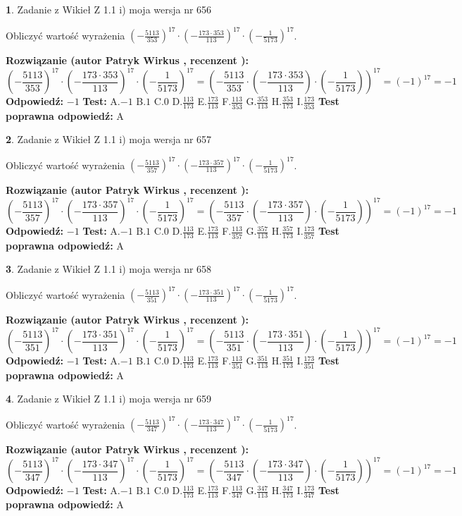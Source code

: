 \documentclass[12pt, a4paper]{article}
\theoremstyle{definition} %
\newtheorem{zad}{}
\newcommand{\zadStart}[1]{\begin{zad}#1\newline}
\newcommand{\zadStop}{\end{zad}}
\newcommand{\rozwStart}[2]{\noindent \textbf{Rozwiązanie (autor #1 , recenzent #2): }\newline}
\newcommand{\rozwStop}{\newline}
\newcommand{\odpStart}{\noindent \textbf{Odpowiedź:}\newline}
\newcommand{\odpStop}{\newline}
\newcommand{\testStart}{\noindent \textbf{Test:}\newline}
\newcommand{\testStop}{\newline}
\newcommand{\kluczStart}{\noindent \textbf{Test poprawna odpowiedź:}\newline}
\newcommand{\kluczStop}{\newline}
\begin{document}
\zadStart{Zadanie z Wikieł Z 1.1 i) moja wersja nr 656}

Obliczyć wartość wyrażenia $(-\frac{5113}{353})^{17} \cdot (-\frac{173 \cdot 353}{113})^{17} \cdot (-\frac{1}{5173})^{17}$.
\zadStop
\rozwStart{Patryk Wirkus}{}
$$(-\frac{5113}{353})^{17} \cdot (-\frac{173 \cdot 353}{113})^{17} \cdot (-\frac{1}{5173})^{17} = (-\frac{5113}{353} \cdot (-\frac{173 \cdot 353}{113}) \cdot (-\frac{1}{5173}))^{17} = (-1)^{17} = -1$$
\rozwStop
\odpStart
$-1$
\odpStop
\testStart
A.$-1$ B.$1$ C.$0$ D.$\frac{113}{173}$ E.$\frac{173}{113}$
F.$\frac{113}{353}$ G.$\frac{353}{113}$
H.$\frac{353}{173}$
I.$\frac{173}{353}$
\testStop
\kluczStart
A
\kluczStop



\zadStart{Zadanie z Wikieł Z 1.1 i) moja wersja nr 657}

Obliczyć wartość wyrażenia $(-\frac{5113}{357})^{17} \cdot (-\frac{173 \cdot 357}{113})^{17} \cdot (-\frac{1}{5173})^{17}$.
\zadStop
\rozwStart{Patryk Wirkus}{}
$$(-\frac{5113}{357})^{17} \cdot (-\frac{173 \cdot 357}{113})^{17} \cdot (-\frac{1}{5173})^{17} = (-\frac{5113}{357} \cdot (-\frac{173 \cdot 357}{113}) \cdot (-\frac{1}{5173}))^{17} = (-1)^{17} = -1$$
\rozwStop
\odpStart
$-1$
\odpStop
\testStart
A.$-1$ B.$1$ C.$0$ D.$\frac{113}{173}$ E.$\frac{173}{113}$
F.$\frac{113}{357}$ G.$\frac{357}{113}$
H.$\frac{357}{173}$
I.$\frac{173}{357}$
\testStop
\kluczStart
A
\kluczStop



\zadStart{Zadanie z Wikieł Z 1.1 i) moja wersja nr 658}

Obliczyć wartość wyrażenia $(-\frac{5113}{351})^{17} \cdot (-\frac{173 \cdot 351}{113})^{17} \cdot (-\frac{1}{5173})^{17}$.
\zadStop
\rozwStart{Patryk Wirkus}{}
$$(-\frac{5113}{351})^{17} \cdot (-\frac{173 \cdot 351}{113})^{17} \cdot (-\frac{1}{5173})^{17} = (-\frac{5113}{351} \cdot (-\frac{173 \cdot 351}{113}) \cdot (-\frac{1}{5173}))^{17} = (-1)^{17} = -1$$
\rozwStop
\odpStart
$-1$
\odpStop
\testStart
A.$-1$ B.$1$ C.$0$ D.$\frac{113}{173}$ E.$\frac{173}{113}$
F.$\frac{113}{351}$ G.$\frac{351}{113}$
H.$\frac{351}{173}$
I.$\frac{173}{351}$
\testStop
\kluczStart
A
\kluczStop



\zadStart{Zadanie z Wikieł Z 1.1 i) moja wersja nr 659}

Obliczyć wartość wyrażenia $(-\frac{5113}{347})^{17} \cdot (-\frac{173 \cdot 347}{113})^{17} \cdot (-\frac{1}{5173})^{17}$.
\zadStop
\rozwStart{Patryk Wirkus}{}
$$(-\frac{5113}{347})^{17} \cdot (-\frac{173 \cdot 347}{113})^{17} \cdot (-\frac{1}{5173})^{17} = (-\frac{5113}{347} \cdot (-\frac{173 \cdot 347}{113}) \cdot (-\frac{1}{5173}))^{17} = (-1)^{17} = -1$$
\rozwStop
\odpStart
$-1$
\odpStop
\testStart
A.$-1$ B.$1$ C.$0$ D.$\frac{113}{173}$ E.$\frac{173}{113}$
F.$\frac{113}{347}$ G.$\frac{347}{113}$
H.$\frac{347}{173}$
I.$\frac{173}{347}$
\testStop
\kluczStart
A
\kluczStop
\end{document}

